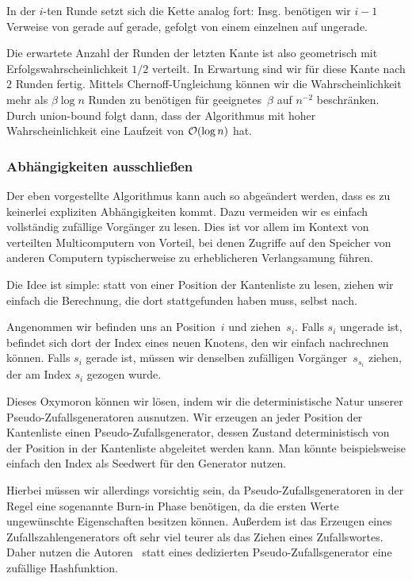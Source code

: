 In der $i$-ten Runde setzt sich die Kette analog fort:
Insg. benötigen wir $i-1$ Verweise von gerade auf gerade, gefolgt von einem einzelnen auf ungerade.

Die erwartete Anzahl der Runden der letzten Kante ist also geometrisch mit Erfolgswahrscheinlichkeit $1/2$ verteilt.
In Erwartung sind wir für diese Kante nach $2$ Runden fertig.
Mittels Chernoff-Ungleichung können wir die Wahrscheinlichkeit mehr als $\beta \log n$ Runden zu benötigen für geeignetes~$\beta$ auf $n^{-2}$ beschränken.
Durch union-bound folgt dann, dass der Algorithmus mit hoher Wahrscheinlichkeit eine Laufzeit von $\mathcal{O}\!\left(\log n\right)$ hat.

\subsubsection{Abhängigkeiten ausschließen}
Der eben vorgestellte Algorithmus kann auch so abgeändert werden, dass es zu keinerlei expliziten Abhängigkeiten kommt.
Dazu vermeiden wir es einfach vollständig zufällige Vorgänger zu lesen.
Dies ist vor allem im Kontext von verteilten Multicomputern von Vorteil, bei denen Zugriffe auf den Speicher von anderen Computern typischerweise zu erheblicheren Verlangsamung führen.

Die Idee ist simple: statt von einer Position der Kantenliste zu lesen, ziehen wir einfach die Berechnung, die dort stattgefunden haben muss, selbst nach.

Angenommen wir befinden uns an Position~$i$ und ziehen~$s_i$.
Falls $s_i$ ungerade ist, befindet sich dort der Index eines neuen Knotens, den wir einfach nachrechnen können.
Falls $s_i$ gerade ist, müssen wir  denselben zufälligen Vorgänger~$s_{s_i}$ ziehen, der am Index $s_i$ gezogen wurde.

Dieses Oxymoron können wir lösen, indem wir die deterministische Natur unserer Pseudo-Zufallsgeneratoren ausnutzen.
Wir erzeugen an jeder Position der Kantenliste einen Pseudo-Zufallsgenerator, dessen Zustand deterministisch von der Position in der Kantenliste abgeleitet werden kann.
Man könnte beispielsweise einfach den Index als Seedwert für den Generator nutzen.

Hierbei müssen wir allerdings vorsichtig sein, da Pseudo-Zufallsgeneratoren in der Regel eine sogenannte Burn-in Phase benötigen, da die ersten Werte ungewünschte Eigenschaften besitzen können.
Außerdem ist das Erzeugen eines Zufallszahlengenerators oft sehr viel teurer als das Ziehen eines Zufallswortes.
Daher nutzen die Autoren~\cite{SANDERS2016489} statt eines dedizierten Pseudo-Zufallsgenerator eine zufällige Hashfunktion.

